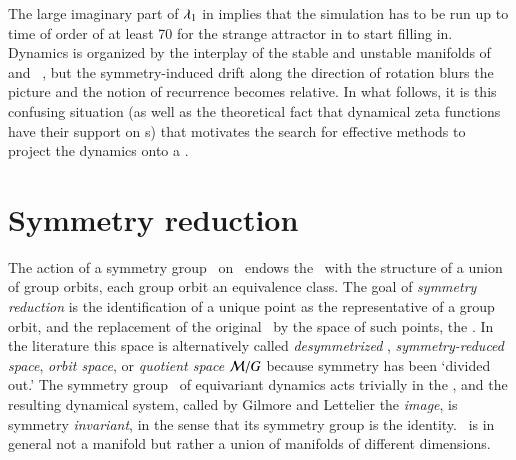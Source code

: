 \documentclass[preprint,number,sort&compress]{elsarticle}
\begin{document}
The large imaginary part of $\eigExp_{1}$ in
 implies that the simulation has to be
run up to time of order of at least 70 for the strange
attractor in  to start filling in. Dynamics
is organized by the interplay of the stable and unstable
manifolds of \eqv\  and \reqv\ , but the
symmetry-induced drift along the direction of rotation blurs
the picture and the notion of recurrence becomes relative. In
what follows, it is this confusing situation (as well as the
theoretical fact that dynamical zeta functions have
their support on \rpo s) that motivates the search for
effective methods to project the dynamics onto a \reducedsp.


\section{\label{s:symmRed} Symmetry reduction}

The action of a symmetry group \Group\ on \pS\ endows the
\statesp\ with the structure of a union of group orbits, each
group orbit an equivalence class. The goal of {\em symmetry
reduction} is the identification of a unique point as the
representative of a group orbit, and the replacement of the
original \statesp\ by the space of such points, the {\em
\reducedsp}. In the literature this space is alternatively
called
\emph{desymmetrized \statesp},
\emph{symmetry-reduced space},
\emph{orbit space}, or \emph{quotient space}
${\cal M}/G$ because symmetry has been `divided out.' {The}
symmetry group \Group\ of equi\-vari\-ant dynamics acts
trivially in {the} \reducedsp, and the resulting dynamical
system, called by Gilmore and Lettelier the
\emph{image}, is symmetry {\em in\-vari\-ant}, in the sense
that its symmetry group is the identity. \Reducedsp\ is in
general not a manifold but rather a union of manifolds of
different dimensions.
\end{document}
